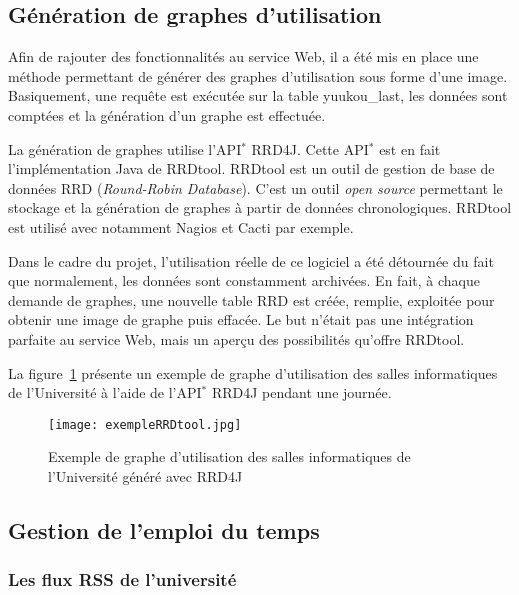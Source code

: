\subsection{G\'en\'eration de graphes d'utilisation}

Afin de rajouter des fonctionnalit\'es au service Web, il a \'et\'e mis en place une m\'ethode permettant de g\'en\'erer des graphes d'utilisation sous forme d'une image.
Basiquement, une requ\^ete est ex\'ecut\'ee sur la table \textsf{yuukou\_last}, les donn\'ees sont compt\'ees et la g\'en\'eration d'un graphe est effectu\'ee.

La g\'en\'eration de graphes utilise l'API$^*$ RRD4J.
Cette API$^*$ est en fait l'impl\'ementation Java de RRDtool.
RRDtool est un outil de gestion de base de donn\'ees RRD (\textit{Round-Robin Database}).
C'est un outil \textit{open source} permettant le stockage et la g\'en\'eration de graphes \`a partir de donn\'ees chronologiques.
RRDtool est utilis\'e avec notamment Nagios et Cacti par exemple.

Dans le cadre du projet, l'utilisation r\'eelle de ce logiciel a \'et\'e d\'etourn\'ee du fait que normalement, les donn\'ees sont constamment archiv\'ees.
En fait, \`a chaque demande de graphes, une nouvelle table RRD est cr\'e\'ee, remplie, exploit\'ee pour obtenir une image de graphe puis effac\'ee.
Le but n'\'etait pas une int\'egration parfaite au service Web, mais un aper\c{c}u des possibilit\'es qu'offre RRDtool.

La figure~\ref{figure:rrdTool} pr\'esente un exemple de graphe d'utilisation des salles informatiques de l'Universit\'e \`a l'aide de l'API$^*$ RRD4J pendant une journ\'ee.

\begin{figure}[!ht]
	\centering
	\texttt{[image: exempleRRDtool.jpg]}
	\caption{Exemple de graphe d'utilisation des salles informatiques de l'Universit\'e g\'en\'er\'e avec RRD4J}
	\label{figure:rrdTool}

\end{figure}

\subsection{Gestion de l'emploi du temps}
\label{section:emploiDuTemps}

\subsubsection{Les flux RSS de l'universit\'e}

